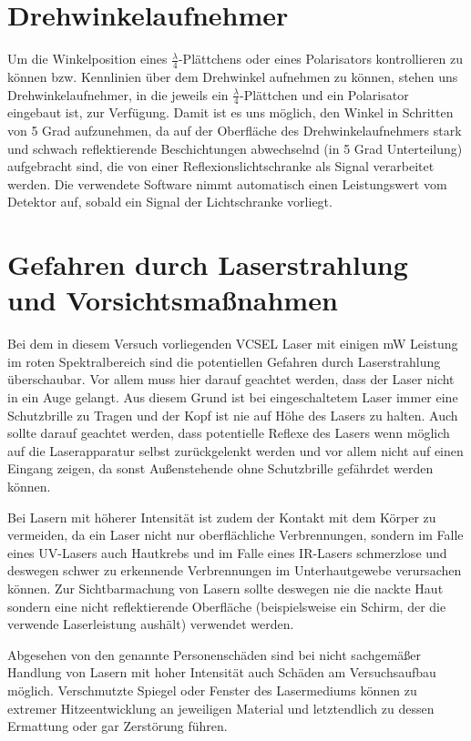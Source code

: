 \documentclass[bigchapter,colorback,accentcolor=tud4b,linedtoc,11pt]{tudreport}
\begin{document}
\section{Drehwinkelaufnehmer}
Um die Winkelposition eines $\frac{\lambda}{4}$-Plättchens oder eines Polarisators kontrollieren zu können bzw. Kennlinien über dem Drehwinkel aufnehmen zu können, stehen uns Drehwinkelaufnehmer, in die jeweils ein $\frac{\lambda}{4}$-Plättchen und ein Polarisator eingebaut ist, zur Verfügung. Damit ist es uns möglich, den Winkel in Schritten von 5 Grad aufzunehmen, da auf der Oberfläche des Drehwinkelaufnehmers stark und schwach reflektierende Beschichtungen abwechselnd (in 5 Grad Unterteilung) aufgebracht sind, die von einer Reflexionslichtschranke als Signal verarbeitet werden. Die verwendete Software nimmt automatisch einen Leistungswert vom Detektor auf, sobald ein Signal der Lichtschranke vorliegt. 


\section{Gefahren durch Laserstrahlung und Vorsichtsmaßnahmen}
Bei dem in diesem Versuch vorliegenden VCSEL Laser mit einigen mW Leistung im roten Spektralbereich sind die potentiellen Gefahren durch Laserstrahlung überschaubar. Vor allem muss hier darauf geachtet werden, dass der Laser nicht in ein Auge gelangt. Aus diesem Grund ist bei eingeschaltetem Laser immer eine Schutzbrille zu Tragen und der Kopf ist nie auf Höhe des Lasers zu halten. Auch sollte darauf geachtet werden, dass potentielle Reflexe des Lasers wenn möglich auf die Laserapparatur selbst zurückgelenkt werden und vor allem nicht auf einen Eingang zeigen, da sonst Außenstehende ohne Schutzbrille gefährdet werden können.

Bei Lasern mit höherer Intensität ist zudem der Kontakt mit dem Körper zu vermeiden, da ein Laser nicht nur oberflächliche Verbrennungen, sondern im Falle eines UV-Lasers auch Hautkrebs und im Falle eines IR-Lasers schmerzlose und deswegen schwer zu erkennende Verbrennungen im Unterhautgewebe verursachen können. Zur Sichtbarmachung von Lasern sollte deswegen nie die nackte Haut sondern eine nicht reflektierende Oberfläche (beispielsweise ein Schirm, der die verwende Laserleistung aushält) verwendet werden.

Abgesehen von den genannte Personenschäden sind bei nicht sachgemäßer Handlung von Lasern mit hoher Intensität auch Schäden am Versuchsaufbau möglich. Verschmutzte Spiegel oder Fenster des Lasermediums können zu extremer Hitzeentwicklung an jeweiligen Material und letztendlich zu dessen Ermattung oder gar Zerstörung führen.
\cite{GefahrenLaser}
\end{document}

